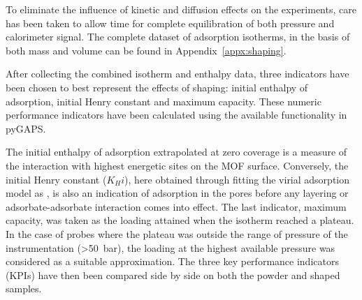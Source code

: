 To eliminate the influence of kinetic and diffusion effects on the experiments,
care has been taken to allow time for complete equilibration of both pressure
and calorimeter signal.
The complete dataset of adsorption isotherms, in the basis of both mass 
and volume can be found in Appendix~\ref{appx:shaping}.

After collecting the combined isotherm and enthalpy data, three 
indicators have been chosen to best represent the effects of shaping: 
initial enthalpy of adsorption, initial Henry constant and maximum capacity.
These numeric performance indicators have been calculated using the
available functionality in pyGAPS.

The initial enthalpy of adsorption extrapolated at zero coverage is 
a measure of the interaction with highest energetic sites on the MOF 
surface. Conversely, the initial Henry constant (\(K_Hi\)), here obtained through fitting the virial adsorption model as ,
is also an indication of adsorption in the pores before any 
layering or adsorbate-adsorbate interaction comes into effect.
The last indicator, maximum capacity, was taken as the loading attained when 
the isotherm reached a plateau. In the case of probes where the plateau
was outside the range of pressure of the instrumentation (>\SI{50}{\bar}), 
the loading at the highest available pressure was considered as a 
suitable approximation.
The three key performance indicators (KPIs) have then been compared side by 
side on both the powder and shaped samples.





